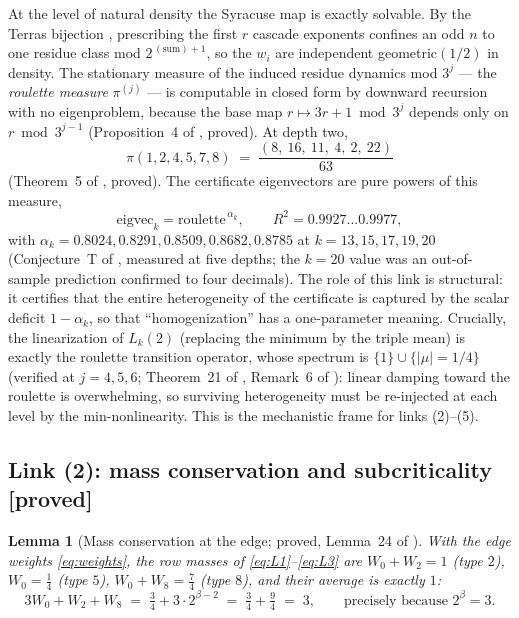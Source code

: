 \documentclass[11pt]{article}
\newtheorem{lemma}[theorem]{Lemma}
\theoremstyle{definition}
\theoremstyle{remark}
\newcommand{\bet}{\beta}
\begin{document}
At the level of natural density the Syracuse map is exactly solvable. By the
Terras bijection \cite{Ter76}, prescribing the first $r$ cascade exponents
confines an odd $n$ to one residue class mod $2^{\,(\text{sum})+1}$, so the
$w_i$ are independent geometric$(1/2)$ in density. The stationary measure of the
induced residue dynamics mod $3^j$ --- the \emph{roulette measure} $\pi^{(j)}$
--- is computable in closed form by downward recursion with no eigenproblem,
because the base map $r \mapsto 3r + 1 \bmod 3^j$ depends only on
$r \bmod 3^{j-1}$ (Proposition~4 of \cite{Temp26}, proved). At depth two,
\begin{equation}
\pi(1,2,4,5,7,8) \;=\; \frac{(8,\ 16,\ 11,\ 4,\ 2,\ 22)}{63}
\label{eq:mod9}
\end{equation}
(Theorem~5 of \cite{Temp26}, proved). The certificate eigenvectors are pure
powers of this measure,
\begin{equation}
\mathrm{eigvec}_k = \mathrm{roulette}^{\,\alpha_k},
\qquad R^2 = 0.9927 \ldots 0.9977,
\label{eq:tempering}
\end{equation}
with $\alpha_k = 0.8024, 0.8291, 0.8509, 0.8682, 0.8785$ at
$k = 13, 15, 17, 19, 20$ (Conjecture~T of \cite{Temp26}, measured at five
depths; the $k = 20$ value was an out-of-sample prediction confirmed to four
decimals). The role of this link is structural: it certifies that the entire
heterogeneity of the certificate is captured by the scalar deficit
$1 - \alpha_k$, so that ``homogenization'' has a one-parameter meaning.
Crucially, the linearization of $L_k(2)$ (replacing the minimum by the triple
mean) is exactly the roulette transition operator, whose spectrum is
$\{1\} \cup \{|\mu| = 1/4\}$ (verified at $j = 4, 5, 6$; Theorem~21 of
\cite{NOTE}, Remark~6 of \cite{Temp26}): linear damping toward the roulette is
overwhelming, so surviving heterogeneity must be re-injected at each level by
the min-nonlinearity. This is the mechanistic frame for links (2)--(5).

\subsection{Link (2): mass conservation and subcriticality
\textnormal{[proved]}}
\label{sec:link2}

\begin{lemma}[Mass conservation at the edge; proved, Lemma~24 of \cite{NOTE}]
\label{lem:mass}
With the edge weights \eqref{eq:weights}, the row masses of
\eqref{eq:L1}--\eqref{eq:L3} are $W_0 + W_2 = 1$ (type $2$), $W_0 = \tfrac14$
(type $5$), $W_0 + W_8 = \tfrac74$ (type $8$), and their average is exactly $1$:
\begin{equation}
3 W_0 + W_2 + W_8 \;=\; \tfrac34 + 3 \cdot 2^{\bet-2}
\;=\; \tfrac34 + \tfrac94 \;=\; 3,
\qquad \text{precisely because } 2^{\bet} = 3 .
\label{eq:massconv}
\end{equation}
\end{lemma}
\end{document}

